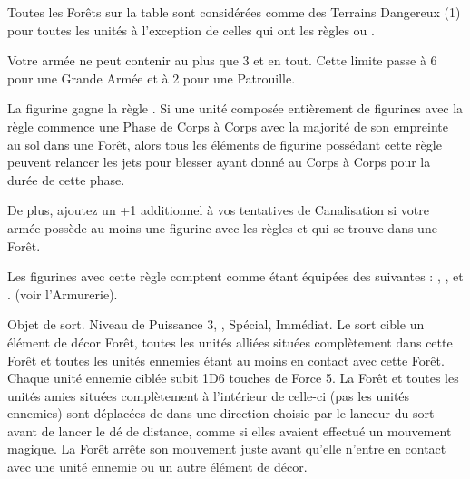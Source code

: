 Toutes les Forêts sur la table sont considérées comme des Terrains Dangereux (1) pour toutes les unités à l'exception de celles qui ont les règles \strider{} ou \strider{\forest}. 

\armyspecialruleentry{\therarestofspirits}

Votre armée ne peut contenir au plus que 3 \treefathers{} et \treefatherancients{} en tout. Cette limite passe à 6 pour une Grande Armée et à 2 pour une Patrouille.

\closearmywiderules

\vspace*{1.5cm}
\startarmyspecialrules

\armyspecialruleentry{\forestwalker}

La figurine gagne la règle \strider{\forest}. Si une unité composée entièrement de figurines avec la règle \forestwalker{} commence une Phase de Corps à Corps avec la majorité de son empreinte au sol dans une Forêt, alors tous les éléments de figurine possédant cette règle peuvent relancer les jets pour blesser ayant donné  au Corps à Corps pour la durée de cette phase.

De plus, ajoutez un +1 additionnel à vos tentatives de Canalisation si votre armée possède au moins une figurine avec les règles \channel{} et \forestwalker{} qui se trouve dans une Forêt. 

\armyspecialruleentry{\masterarchers}

Les figurines avec cette règle comptent comme étant équipées des \feyarrows{} suivantes : \truemarkarrows{}, \starlightshaft{}, \perforatingtip et \jewelweedshot. (voir l'Armurerie).

\armyspecialruleentry{\treesinging}

Objet de sort. Niveau de Puissance 3, , Spécial, Immédiat. Le sort cible un élément de décor Forêt, toutes les unités alliées situées complètement dans cette Forêt et toutes les unités ennemies étant au moins en contact avec cette Forêt. Chaque unité ennemie ciblée subit 1D6 touches de Force 5. La Forêt et toutes les unités amies situées complètement à l'intérieur de celle-ci (pas les unités ennemies) sont déplacées de  dans une direction choisie par le lanceur du sort avant de lancer le dé de distance, comme si elles avaient effectué un mouvement magique. La Forêt arrête son mouvement juste avant qu'elle n'entre en contact avec une unité ennemie ou un autre élément de décor.

\armyspecialruleentry{\emboldeningboughs}

